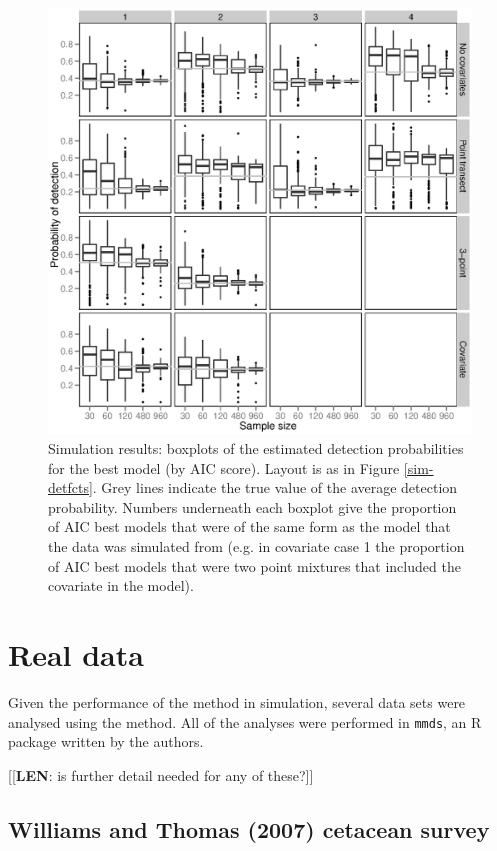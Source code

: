 \documentclass[useAMS,referee, usegraphicx]{biom}
\begin{document}
\begin{figure}
\centering
\includegraphics[width=\textwidth]{simulations/pa-plot.eps}
\caption{Simulation results: boxplots of the estimated detection probabilities for the best model (by AIC score). Layout is as in Figure \ref{sim-detfcts}. Grey lines indicate the true value of the average detection probability. Numbers underneath each boxplot give the proportion of AIC best models that were of the same form as the model that the data was simulated from (e.g. in covariate case 1 the proportion of AIC best models that were two point mixtures that included the covariate in the model).}
\label{sim-boxplots}
\end{figure}


\section{Real data}
\label{s:data}

Given the performance of the method in simulation, several data sets were analysed using the method. All of the analyses were performed in \texttt{mmds}, an \textsf{R} package written by the authors.

[[\textbf{LEN}: is further detail needed for any of these?]]

\subsection{Williams and Thomas (2007) cetacean survey}
\end{document}
